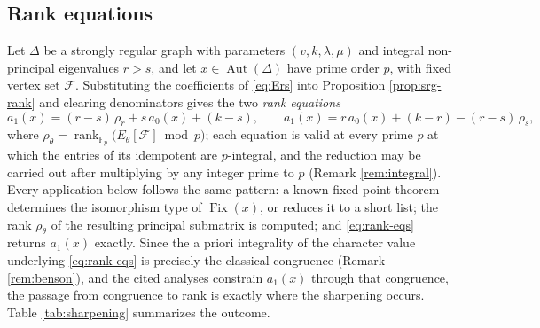 \documentclass[11pt]{article}
\theoremstyle{plain}
\theoremstyle{remark}
\newcommand{\Aut}{\operatorname{Aut}}
\newcommand{\Fix}{\operatorname{Fix}}
\newcommand{\rank}{\operatorname{rank}}
\newcommand{\Fp}{\mathbb F_p}
\begin{document}
\subsection{Rank equations}\label{subsec:rank-eqs}

Let $\Delta$ be a strongly regular graph with parameters $(v,k,\lambda,\mu)$ and integral non-principal eigenvalues $r>s$,
and let $x\in\Aut(\Delta)$ have prime order $p$, with fixed vertex set $\mathcal F$.
Substituting the coefficients of \eqref{eq:Ers} into Proposition \ref{prop:srg-rank} and clearing denominators gives the two \emph{rank equations}
\begin{equation}\label{eq:rank-eqs}
 a_1(x)=(r-s)\,\rho_r+s\,a_0(x)+(k-s),
 \qquad
 a_1(x)=r\,a_0(x)+(k-r)-(r-s)\,\rho_s,
\end{equation}
where $\rho_\theta=\rank_{\Fp}\bigl(E_\theta[\mathcal F]\bmod p\bigr)$;
each equation is valid at every prime $p$ at which the entries of its idempotent are $p$-integral,
and the reduction may be carried out after multiplying by any integer prime to $p$ (Remark \ref{rem:integral}).
Every application below follows the same pattern:
a known fixed-point theorem determines the isomorphism type of $\Fix(x)$, or reduces it to a short list;
the rank $\rho_\theta$ of the resulting principal submatrix is computed;
and \eqref{eq:rank-eqs} returns $a_1(x)$ exactly.
Since the a priori integrality of the character value underlying \eqref{eq:rank-eqs} is precisely the classical congruence (Remark \ref{rem:benson}),
and the cited analyses constrain $a_1(x)$ through that congruence,
the passage from congruence to rank is exactly where the sharpening occurs.
Table \ref{tab:sharpening} summarizes the outcome.
\end{document}
